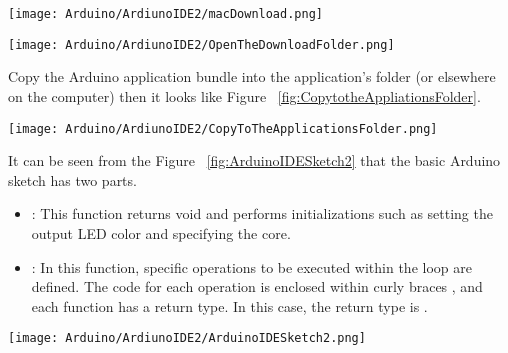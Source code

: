 \begin{center}
	
	\texttt{[image: Arduino/ArdiunoIDE2/macDownload.png]}
	\label{fig:ArduinoIDECreateAgentInstallation}
	
	
	
	
	
	
	
\end{center}

\begin{center}
	\texttt{[image: Arduino/ArdiunoIDE2/OpenTheDownloadFolder.png]}
\end{center}

Copy the Arduino application bundle into the application's folder (or elsewhere on the
computer) then it looks like Figure   ~\ref{fig:CopytotheAppliationsFolder}.

\begin{center}
	
	\texttt{[image: Arduino/ArdiunoIDE2/CopyToTheApplicationsFolder.png]}
	\label{fig:CopytotheAppliationsFolder}
\end{center}

It can be seen from the Figure ~\ref{fig:ArduinoIDESketch2} that the basic Arduino sketch has two parts. 

\begin{itemize}
	
	\item {}: This function returns void
	and performs initializations such as setting the output LED color and specifying the core.
	\item {}: In this function, specific operations to be executed within the loop are defined. The code for each operation is enclosed within curly braces \PYTHON{\{\}}, and each function has a return type. In this case, the return type is .
	
\end{itemize}

\begin{center}
	
	
	
	\texttt{[image: Arduino/ArdiunoIDE2/ArduinoIDESketch2.png]}
	\label{fig:ArduinoIDESketch2}
	
	
	
	
\end{center}





